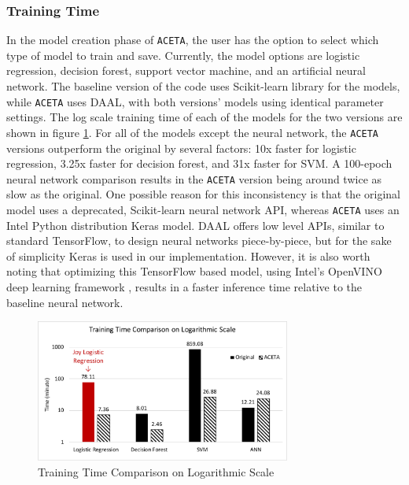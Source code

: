 \subsubsection{Training Time}
In the model creation phase of \texttt{ACETA}, the user has the option to select which type of model to train and save. Currently, the model options are logistic regression, decision forest, support vector machine, and an artificial neural network. The baseline version of the code uses Scikit-learn library for the models, while \texttt{ACETA} uses DAAL, with both versions' models using identical parameter settings. The log scale training time of each of the models for the two versions are shown in figure \ref{figure:training-time}. For all of the models except the neural network, the \texttt{ACETA} versions outperform the original by several factors: 10x faster for logistic regression, 3.25x faster for decision forest, and 31x faster for SVM. A 100-epoch neural network comparison results in the \texttt{ACETA} version being around twice as slow as the original. One possible reason for this inconsistency is that the original model uses a deprecated, Scikit-learn neural network API, whereas \texttt{ACETA} uses an Intel Python distribution Keras \cite{keras} model. DAAL offers low level APIs, similar to standard TensorFlow, to design neural networks piece-by-piece, but for the sake of simplicity Keras is used in our implementation. However, it is also worth noting that optimizing this TensorFlow based model, using Intel's OpenVINO deep learning framework \cite{openvino}, results in a faster inference time relative to the baseline neural network.

\begin{figure}[h!]
	\centering
	\includegraphics[width=3.3in]{./fig/training-log.pdf}
	\caption{Training Time Comparison on Logarithmic Scale}
	\label{figure:training-time}
\end{figure}

